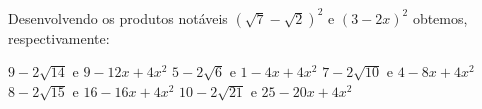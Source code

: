 Desenvolvendo os produtos notáveis $(\sqrt{7}-\sqrt{2})^2$ e $(3-2x)^2$ obtemos, respectivamente:

$9-2\sqrt{14}$ e $9-12x+4x^2$
$5-2\sqrt{6}$ e $1-4x+4x^2$
$7-2\sqrt{10}$ e $4-8x+4x^2$
$8-2\sqrt{15}$ e $16-16x+4x^2$
$10-2\sqrt{21}$ e $25-20x+4x^2$


